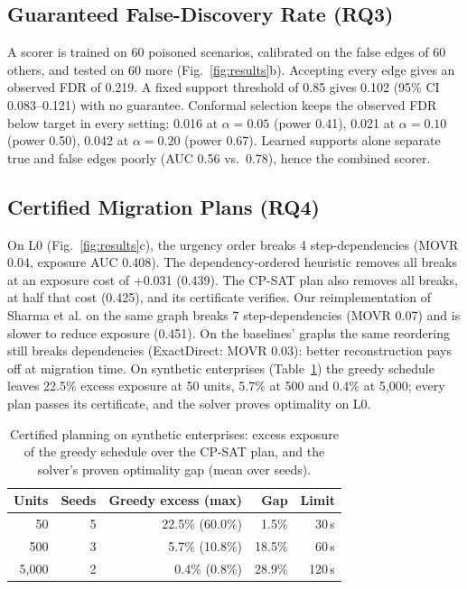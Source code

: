 \documentclass[a4paper,twoside]{article}
\begin{document}
\subsection{Guaranteed False-Discovery Rate (RQ3)}
A scorer is trained on 60 poisoned scenarios, calibrated on the false edges of 60 others, and tested on 60 more (Fig.~\ref{fig:results}b). Accepting every edge gives an observed FDR of 0.219. A fixed support threshold of 0.85 gives 0.102 (95\% CI 0.083--0.121) with no guarantee. Conformal selection keeps the observed FDR below target in every setting: 0.016 at $\alpha=0.05$ (power 0.41), 0.021 at $\alpha=0.10$ (power 0.50), 0.042 at $\alpha=0.20$ (power 0.67). Learned supports alone separate true and false edges poorly (AUC 0.56 vs.\ 0.78), hence the combined scorer.


\subsection{Certified Migration Plans (RQ4)}
On L0 (Fig.~\ref{fig:results}c), the urgency order breaks 4 step-dependencies (MOVR 0.04, exposure AUC 0.408). The dependency-ordered heuristic removes all breaks at an exposure cost of +0.031 (0.439). The CP-SAT plan also removes all breaks, at half that cost (0.425), and its certificate verifies. Our reimplementation of Sharma et al. \cite{sharma2026dependency} on the same graph breaks 7 step-dependencies (MOVR 0.07) and is slower to reduce exposure (0.451). On the baselines' graphs the same reordering still breaks dependencies (ExactDirect: MOVR 0.03): better reconstruction pays off at migration time. On synthetic enterprises (Table~\ref{tab:plan}) the greedy schedule leaves 22.5\% excess exposure at 50 units, 5.7\% at 500 and 0.4\% at 5{,}000; every plan passes its certificate, and the solver proves optimality on L0.

\begin{table}[t]
\caption{Certified planning on synthetic enterprises: excess exposure of the greedy schedule over the CP-SAT plan, and the solver's proven optimality gap (mean over seeds).}
\label{tab:plan}
\centering\small\setlength{\tabcolsep}{4pt}
\begin{tabular}{@{}rrrrr@{}}
\toprule
Units & Seeds & Greedy excess (max) & Gap & Limit \\
\midrule
50 & 5 & 22.5\% (60.0\%) & 1.5\% & 30\,s \\
500 & 3 & 5.7\% (10.8\%) & 18.5\% & 60\,s \\
5{,}000 & 2 & 0.4\% (0.8\%) & 28.9\% & 120\,s \\
\bottomrule
\end{tabular}
\end{table}
\end{document}
